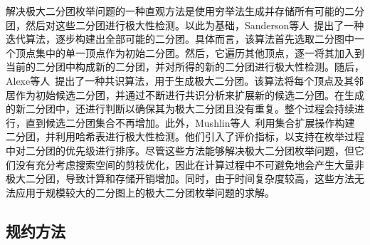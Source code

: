 解决极大二分团枚举问题的一种直观方法是使用穷举法生成并存储所有可能的二分团，然后对这些二分团进行极大性检测。以此为基础，Sanderson等人~\cite{exhaust03}提出了一种迭代算法，逐步构建出全部可能的二分团。具体而言，该算法首先选取二分图中一个顶点集中的单一顶点作为初始二分团。然后，它遍历其他顶点，逐一将其加入到当前的二分团中构成新的二分团，并对所得的新的二分团进行极大性检测。随后，Alexe等人~\cite{MICA04}提出了一种共识算法，用于生成极大二分团。该算法将每个顶点及其邻居作为初始候选二分团，并通过不断进行共识分析来扩展新的候选二分团。在生成的新二分团中，还进行判断以确保其为极大二分团且没有重复。整个过程会持续进行，直到候选二分团集合不再增加。此外，Mushlin等人~\cite{exhaust07}利用集合扩展操作构建二分团，并利用哈希表进行极大性检测。他们引入了评价指标，以支持在枚举过程中对二分团的优先级进行排序。尽管这些方法能够解决极大二分团枚举问题，但它们没有充分考虑搜索空间的剪枝优化，因此在计算过程中不可避免地会产生大量非极大二分团，导致计算和存储开销增加。同时，由于时间复杂度较高，这些方法无法应用于规模较大的二分图上的极大二分团枚举问题的求解。


\subsection{规约方法}

